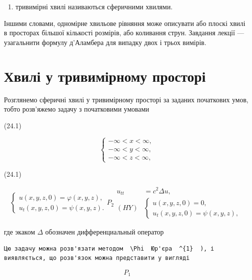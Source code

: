 \documentclass[
  ukrainian,
]{article}
\providecommand{\tightlist}{%
  \setlength{\itemsep}{0pt}\setlength{\parskip}{0pt}}
\begin{document}
\begin{enumerate}
\def\labelenumi{\arabic{enumi})}
\setcounter{enumi}{2}
\tightlist
\item
  тривимірні хвилі називаються сферичними хвилями.
\end{enumerate}

Іншими словами, одномірне хвильове рівняння може описувати або плоскі
хвилі в просторах більшої кількості розмірів, або коливання струн.
Завдання лекції --- узагальнити формулу д'Аламбера для випадку двох і
трьох вимірів.

\section{Хвилі у тривимірному
просторі}\label{ux445ux432ux438ux43bux456-ux443-ux442ux440ux438ux432ux438ux43cux456ux440ux43dux43eux43cux443-ux43fux440ux43eux441ux442ux43eux440ux456}

Розглянемо сферичні хвилі у тривимірному просторі за заданих початкових
умов, тобто розв'яжемо задачу з початковими умовами

(24.1)

\[
\begin{cases} -\infty < x < \infty, \\ -\infty < y < \infty, \\ -\infty < z < \infty, \end{cases}
\]

(24.1)

\[
\begin{cases} u(x, y, z, 0) = \varphi(x, y, z), \\ u_{t}(x, y, z, 0) = \psi(x, y, z). \end{cases}
P_{2}
\begin{aligned} u_{tt} &= c^2 \Delta u, \\ (HY) & \begin{cases} u(x, y, z, 0) = 0, \\ u_t(x, y, z, 0) = \psi(x, y, z), \end{cases} \end{aligned}
\]

где экаком \(\Delta\) обозначен дифференциальный оператор

\begin{verbatim}
Цю задачу можна розв'язати методом  \Phi  Юр'єра  ^{1}  ), і виявляється, що розв'язок можна представити у вигляді
\end{verbatim}

\[
P_{1}
\]
\end{document}
